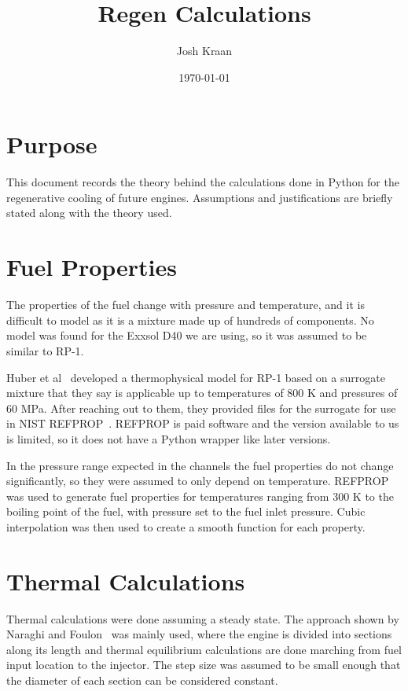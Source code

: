 \documentclass[11pt]{article}
\title{Regen Calculations}
\author{Josh Kraan}
\date{\today}
\begin{document}
\maketitle

\section{Purpose}

This document records the theory behind the calculations done in Python for the regenerative cooling of future engines. Assumptions and justifications are briefly stated along with the theory used.

\section{Fuel Properties}

The properties of the fuel change with pressure and temperature, and it is difficult to model as it is a mixture made up of hundreds of components. No model was found for the Exxsol D40 we are using, so it was assumed to be similar to RP-1.

Huber et al~\cite{huber_preliminary_2009} developed a thermophysical model for RP-1 based on a surrogate mixture that they say is applicable up to temperatures of 800 K and pressures of 60 MPa. After reaching out to them, they provided files for the surrogate for use in NIST REFPROP~\cite{lemmon_rp10}. REFPROP is paid software and the version available to us is limited, so it does not have a Python wrapper like later versions.

In the pressure range expected in the channels the fuel properties do not change significantly, so they were assumed to only depend on temperature. REFPROP was used to generate fuel properties for temperatures ranging from 300 K to the boiling point of the fuel, with pressure set to the fuel inlet pressure. Cubic interpolation was then used to create a smooth function for each property.

\section{Thermal Calculations}

Thermal calculations were done assuming a steady state. The approach shown by Naraghi and Foulon~\cite{naraghi_simple_2008} was mainly used, where the engine is divided into sections along its length and thermal equilibrium calculations are done marching from fuel input location to the injector. The step size was assumed to be small enough that the diameter of each section can be considered constant.
\end{document}
